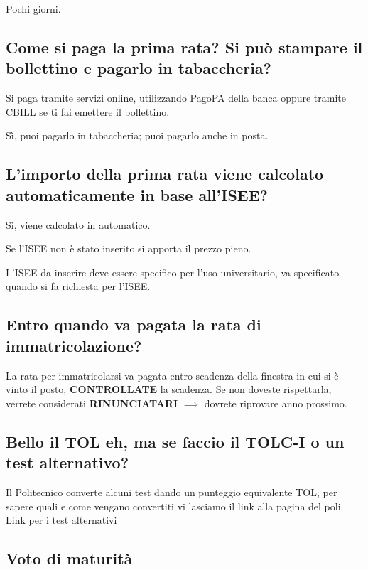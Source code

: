 \documentclass[legal]{polinetwork}
\begin{document}
Pochi giorni.

\subsection{Come si paga la prima rata? Si può stampare il bollettino e pagarlo in tabaccheria?}


Si paga tramite servizi online, utilizzando PagoPA della banca oppure tramite CBILL se ti fai emettere il bollettino.

Sì, puoi pagarlo in tabaccheria; puoi pagarlo anche in posta.

\subsection{L'importo della prima rata viene calcolato automaticamente in base all'ISEE?}


Sì, viene calcolato in automatico.

Se l'ISEE non è stato inserito si apporta il prezzo pieno.

L'ISEE da inserire deve essere specifico per l'uso universitario, va specificato quando si fa richiesta per l'ISEE.

\subsection{Entro quando va pagata la rata di immatricolazione?}


La rata per immatricolarsi va pagata entro scadenza della finestra in cui si è vinto il posto, \textbf{CONTROLLATE} la scadenza. Se non doveste rispettarla, verrete considerati \textbf{RINUNCIATARI} $\implies$ dovrete riprovare anno prossimo.

\subsection{Bello il TOL eh, ma se faccio il TOLC-I o un test alternativo?}


Il Politecnico converte alcuni test dando un punteggio equivalente TOL, per sapere quali e come vengano convertiti vi lasciamo il link alla pagina del poli. \href{https://www.polimi.it/futuri-studenti/test-e-ammissione/laurea/ingegneria/sei-in-possesso-di-un-test-alternativo}{Link per i test alternativi}

\subsection{Voto di maturità}
\end{document}
